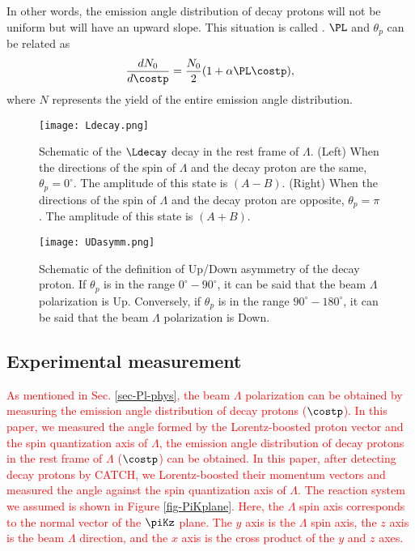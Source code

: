 In other words, the emission angle distribution of decay protons will not be uniform but will have an upward slope. This situation is called . $\PL$ and $\theta_{p}$ can be related as 
\begin{equation}
  \frac{dN_0}{d\costp} = \frac{N_0}{2}(1+\alpha\PL\costp), 
  \label{eq-costp}
\end{equation}
where $N$ represents the yield of the entire emission angle distribution. %

\begin{figure}[h]
  \centering
  \texttt{[image: Ldecay.png]}
  \caption{Schematic of the $\Ldecay$ decay in the rest frame of $\Lambda$. (Left) When the directions of the spin of $\Lambda$ and the decay proton are the same, $\theta_{p}=0^{\circ}$. The amplitude of this state is $(A-B)$. (Right) When the directions of the spin of $\Lambda$ and the decay proton are opposite, $\theta_{p}=\pi$. The amplitude of this state is $(A+B)$.}
  \label{fig-Ldecay}
\end{figure}

\begin{figure}[h]
  \centering
  \texttt{[image: UDasymm.png]}
  \caption{Schematic of the definition of Up/Down asymmetry of the decay proton. If $\theta_{p}$ is in the range $0^{\circ}-90^{\circ}$, it can be said that the beam $\Lambda$ polarization is Up. Conversely, if $\theta_{p}$ is in the range $90^{\circ}-180^{\circ}$, it can be said that the beam $\Lambda$ polarization is Down.}
  \label{fig-UDasymm}
\end{figure}


\subsection{Experimental measurement}

\textcolor{red}{ As mentioned in Sec. \ref{sec-Pl-phys}, the beam $\Lambda$ polarization can be obtained by measuring the emission angle distribution of decay protons ($\costp$). In this paper, we measured the angle formed by the Lorentz-boosted proton vector and the spin quantization axis of $\Lambda$, the emission angle distribution of decay protons in the rest frame of $\Lambda$ ($\costp$) can be obtained. In this paper, after detecting decay protons by CATCH, we Lorentz-boosted their momentum vectors and measured the angle against the spin quantization axis of $\Lambda$. The reaction system we assumed is shown in Figure \ref{fig-PiKplane}. Here, the $\Lambda$ spin axis corresponds to the normal vector of the $\piKz$ plane. The $y$ axis is the $\Lambda$ spin axis, the $z$ axis is the beam $\Lambda$ direction, and the $x$ axis is the cross product of the $y$ and $z$ axes. }

